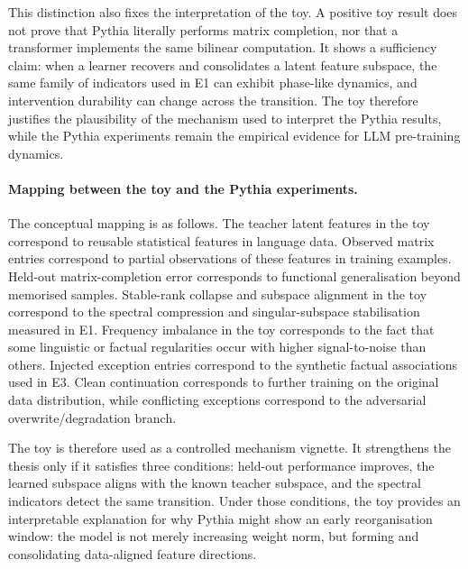 This distinction also fixes the interpretation of the toy. A positive toy result does not prove that Pythia literally performs matrix completion, nor that a transformer implements the same bilinear computation. It shows a sufficiency claim: when a learner recovers and consolidates a latent feature subspace, the same family of indicators used in E1 can exhibit phase-like dynamics, and intervention durability can change across the transition. The toy therefore justifies the plausibility of the mechanism used to interpret the Pythia results, while the Pythia experiments remain the empirical evidence for LLM pre-training dynamics.

\paragraph{Mapping between the toy and the Pythia experiments.}
The conceptual mapping is as follows. The teacher latent features in the toy correspond to reusable statistical features in language data. Observed matrix entries correspond to partial observations of these features in training examples. Held-out matrix-completion error corresponds to functional generalisation beyond memorised samples. Stable-rank collapse and subspace alignment in the toy correspond to the spectral compression and singular-subspace stabilisation measured in E1. Frequency imbalance in the toy corresponds to the fact that some linguistic or factual regularities occur with higher signal-to-noise than others. Injected exception entries correspond to the synthetic factual associations used in E3. Clean continuation corresponds to further training on the original data distribution, while conflicting exceptions correspond to the adversarial overwrite/degradation branch.

The toy is therefore used as a controlled mechanism vignette. It strengthens the thesis only if it satisfies three conditions: held-out performance improves, the learned subspace aligns with the known teacher subspace, and the spectral indicators detect the same transition. Under those conditions, the toy provides an interpretable explanation for why Pythia might show an early reorganisation window: the model is not merely increasing weight norm, but forming and consolidating data-aligned feature directions.
